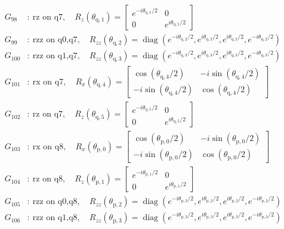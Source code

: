 \begin{align*}
G_{98}&:\ \text{rz on q7},\quad R_z(\theta_{\mathrm{q},1})=\begin{bmatrix}e^{-i\theta_{\mathrm{q},1}/2}&0\\0&e^{i\theta_{\mathrm{q},1}/2}\end{bmatrix}\\
G_{99}&:\ \text{rzz on q0,q7},\quad R_{zz}(\theta_{\mathrm{q},2})=\operatorname{diag}(e^{-i\theta_{\mathrm{q},2}/2},e^{i\theta_{\mathrm{q},2}/2},e^{i\theta_{\mathrm{q},2}/2},e^{-i\theta_{\mathrm{q},2}/2})\\
G_{100}&:\ \text{rzz on q1,q7},\quad R_{zz}(\theta_{\mathrm{q},3})=\operatorname{diag}(e^{-i\theta_{\mathrm{q},3}/2},e^{i\theta_{\mathrm{q},3}/2},e^{i\theta_{\mathrm{q},3}/2},e^{-i\theta_{\mathrm{q},3}/2})\\
G_{101}&:\ \text{rx on q7},\quad R_x(\theta_{\mathrm{q},4})=\begin{bmatrix}\cos(\theta_{\mathrm{q},4}/2)&-i\sin(\theta_{\mathrm{q},4}/2)\\-i\sin(\theta_{\mathrm{q},4}/2)&\cos(\theta_{\mathrm{q},4}/2)\end{bmatrix}\\
G_{102}&:\ \text{rz on q7},\quad R_z(\theta_{\mathrm{q},5})=\begin{bmatrix}e^{-i\theta_{\mathrm{q},5}/2}&0\\0&e^{i\theta_{\mathrm{q},5}/2}\end{bmatrix}\\
G_{103}&:\ \text{rx on q8},\quad R_x(\theta_{\mathrm{p},0})=\begin{bmatrix}\cos(\theta_{\mathrm{p},0}/2)&-i\sin(\theta_{\mathrm{p},0}/2)\\-i\sin(\theta_{\mathrm{p},0}/2)&\cos(\theta_{\mathrm{p},0}/2)\end{bmatrix}\\
G_{104}&:\ \text{rz on q8},\quad R_z(\theta_{\mathrm{p},1})=\begin{bmatrix}e^{-i\theta_{\mathrm{p},1}/2}&0\\0&e^{i\theta_{\mathrm{p},1}/2}\end{bmatrix}\\
G_{105}&:\ \text{rzz on q0,q8},\quad R_{zz}(\theta_{\mathrm{p},2})=\operatorname{diag}(e^{-i\theta_{\mathrm{p},2}/2},e^{i\theta_{\mathrm{p},2}/2},e^{i\theta_{\mathrm{p},2}/2},e^{-i\theta_{\mathrm{p},2}/2})\\
G_{106}&:\ \text{rzz on q1,q8},\quad R_{zz}(\theta_{\mathrm{p},3})=\operatorname{diag}(e^{-i\theta_{\mathrm{p},3}/2},e^{i\theta_{\mathrm{p},3}/2},e^{i\theta_{\mathrm{p},3}/2},e^{-i\theta_{\mathrm{p},3}/2})\\

\end{align*}
